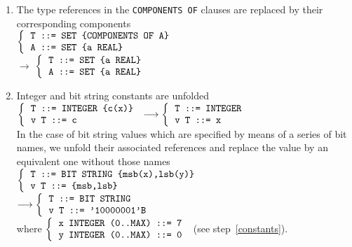 \begin{enumerate}
  \item \label{COMPONENTS_OF_unfolding}
        The type references in the \texttt{\small COMPONENTS OF}
        clauses are replaced by their corresponding components\\
        {\small
         $\left\{
            \begin{tabular}{l}
               \verb+T ::= SET {COMPONENTS OF A}+\\
               \verb+A ::= SET {a REAL}+
            \end{tabular}
          \right.$\\
         $\longrightarrow$
         $\left\{
            \begin{tabular}{l}
              \verb+T ::= SET {a REAL}+\\
              \verb+A ::= SET {a REAL}+
            \end{tabular}
          \right.$}

  \item \label{constants_unfolding}
        Integer and bit string constants are unfolded\\
        {\small
           $\left\{
              \begin{tabular}{l}
                 \verb+T ::= INTEGER {c(x)}+\\
                 \verb+v T ::= c+
              \end{tabular}
            \right.
           \longrightarrow
           \left\{
              \begin{tabular}{l}
                \verb+T ::= INTEGER+\\
                \verb+v T ::= x+
              \end{tabular}
           \right.$
        }\\
        In the case of bit string values which are specified by
        means of a series of bit names, we unfold their associated
        references and replace the value by an equivalent one
        without those names\\
        {\small
           $\left\{
              \begin{tabular}{l}
                \verb+T ::= BIT STRING {msb(x),lsb(y)}+\\
                \verb+v T ::= {msb,lsb}+
              \end{tabular}
            \right.$\\
            $\longrightarrow
            \left\{
              \begin{tabular}{l}
                \verb+T ::= BIT STRING+\\
                \verb+v T ::= '10000001'B+
              \end{tabular}
            \right.$
        }\\
        where 
        {\small
           $\left\{
              \begin{tabular}{l}
                \verb+x INTEGER (0..MAX) ::= 7+\\
                \verb+y INTEGER (0..MAX) ::= 0+
              \end{tabular}
           \right.$
        }
        (see step~\ref{constants}).


\end{enumerate}
